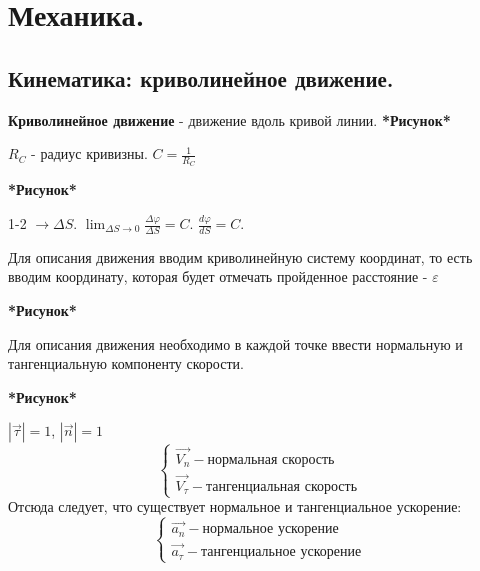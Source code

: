 \documentclass[a4paper,oneside]{article}
\theoremstyle{definition}
\newtheorem{definition}{Определение}[subsection]
\theoremstyle{definition}
\theoremstyle{definition}
\newcommand{\tbf}[1]{\textbf{#1}}
\newcommand{\dslim}{\displaystyle\lim}
\begin{document}
    




\section{Механика.}
\subsection{Кинематика: криволинейное движение.}
    \tbf{Криволинейное движение} - движение вдоль кривой линии.
\tbf{*Рисунок*}

$R_C$ - радиус кривизны. $C = \frac{1}{R_C}$

\tbf{*Рисунок*}

1-2 $\rightarrow \Delta S$. $\dslim_{\Delta S \to 0} \frac{\Delta \varphi} {\Delta S} = C$. $\frac {d \varphi} {dS} = C$.

Для описания движения вводим криволинейную систему координат, то есть вводим координату, которая будет отмечать
пройденное расстояние - $\varepsilon$

\tbf{*Рисунок*}

Для описания движения необходимо в каждой точке ввести нормальную и тангенциальную компоненту скорости.

\tbf{*Рисунок*}

$| \vec{\tau} | = 1$, $| \vec{n} | = 1$
\[
\begin{cases}
    \vec{V_n} - \text{нормальная скорость} \\
    \vec{V_\tau} - \text{тангенциальная скорость}
\end{cases}
\]    
Отсюда следует, что существует нормальное и тангенциальное ускорение:
\[
\begin{cases}
    \vec{a_n} - \text{нормальное ускорение} \\
    \vec{a_\tau} - \text{тангенциальное ускорение}
\end{cases}
\]
\end{document}
